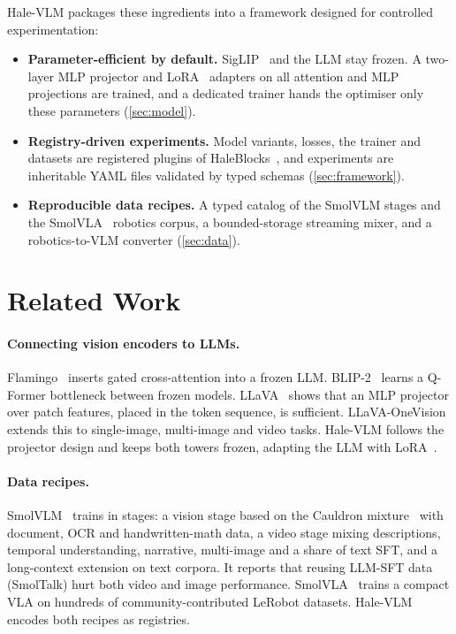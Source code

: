 \documentclass[11pt]{article}
\begin{document}
Hale-VLM packages these ingredients into a framework designed for controlled
experimentation:
\begin{itemize}
  \item \textbf{Parameter-efficient by default.} SigLIP~\cite{zhai2023siglip} and the LLM
        stay frozen. A two-layer MLP projector and LoRA~\cite{hu2022lora} adapters on all
        attention and MLP projections are trained, and a dedicated trainer hands the
        optimiser only these parameters (\cref{sec:model}).
  \item \textbf{Registry-driven experiments.} Model variants, losses, the trainer and
        datasets are registered plugins of HaleBlocks~\cite{haleblocks}, and experiments are
        inheritable YAML files validated by typed schemas (\cref{sec:framework}).
  \item \textbf{Reproducible data recipes.} A typed catalog of the SmolVLM stages and the
        SmolVLA~\cite{shukor2025smolvla} robotics corpus, a bounded-storage streaming
        mixer, and a robotics-to-VLM converter (\cref{sec:data}).
\end{itemize}

\section{Related Work}

\paragraph{Connecting vision encoders to LLMs.} Flamingo~\cite{alayrac2022flamingo} inserts
gated cross-attention into a frozen LLM. BLIP-2~\cite{li2023blip2} learns a Q-Former
bottleneck between frozen models. LLaVA~\cite{liu2023llava,liu2024llava15} shows that an MLP
projector over patch features, placed in the token sequence, is sufficient.
LLaVA-OneVision~\cite{li2024llavaonevision} extends this to single-image, multi-image and
video tasks. Hale-VLM follows the projector design and keeps both towers frozen, adapting
the LLM with LoRA~\cite{hu2022lora}.

\paragraph{Data recipes.} SmolVLM~\cite{marafioti2025smolvlm} trains in stages: a vision stage
based on the Cauldron mixture~\cite{laurencon2024matters} with document, OCR and
handwritten-math data, a video stage mixing descriptions, temporal understanding,
narrative, multi-image and a share of text SFT, and a long-context extension on text
corpora. It reports that reusing LLM-SFT data (SmolTalk) hurt both video and image
performance. SmolVLA~\cite{shukor2025smolvla} trains a compact VLA on hundreds of
community-contributed LeRobot datasets. Hale-VLM encodes both recipes as registries.
\end{document}
